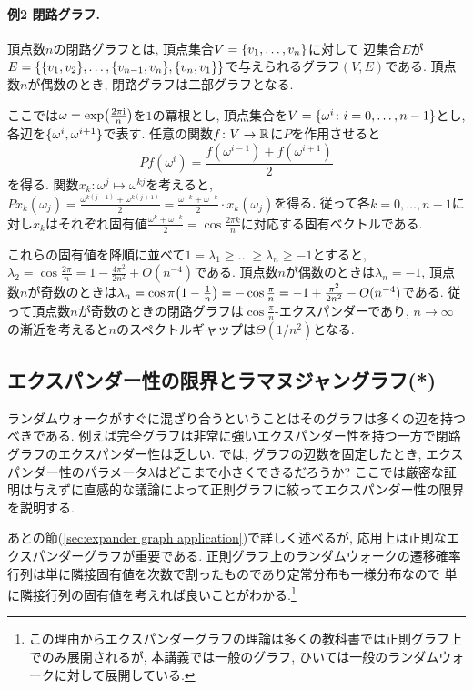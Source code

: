\paragraph*{例2 閉路グラフ.}
頂点数$n$の閉路グラフとは, 頂点集合$V=\lbrace v_1,\dots,v_n\rbrace$に対して
辺集合$E$が$E = \lbrace\lbrace v_1,v_2\rbrace,\dots,\lbrace v_{n-1},v_n\rbrace, \lbrace v_n,v_1\rbrace\rbrace$で与えられるグラフ$(V,E)$である.
頂点数$n$が偶数のとき, 閉路グラフは二部グラフとなる.

ここでは$\omega = \exp\rbra*{\frac{2\pi \mathrm{i}}{n}}$を$1$の冪根とし,
頂点集合を$V=\lbrace\omega^i \colon i=0,\dots,n-1\rbrace$とし, 各辺を$\lbrace\omega^i,\omega^{i+1}\rbrace$で表す.
任意の関数$f\colon V\to \mathbb{R}$に$P$を作用させると
\[ Pf(\omega^i) = \frac{f(\omega^{i-1}) + f(\omega^{i+1})}{2}\]
を得る.
関数$x_k\colon \omega^j \mapsto \omega^{kj}$を考えると,
$Px_k (\omega_j) = \frac{\omega^{k(j-1)} + \omega^{k(j+1)}}{2} = \frac{\omega^{-k}+\omega^{-k}}{2}\cdot x_k(\omega_j)$を得る.
従って各$k=0,\dots,n-1$に対し$x_k$はそれぞれ固有値$\frac{\omega^k + \omega^{-k}}{2} = \cos\frac{2\pi k}{n}$に対応する固有ベクトルである.

これらの固有値を降順に並べて$1=\lambda_1\ge \dots\ge \lambda_n\ge-1$とすると,
$\lambda_2 = \cos\frac{2\pi}{n} = 1-\frac{4\pi^2}{2n^2} + O(n^{-4})$である.
頂点数$n$が偶数のときは$\lambda_n = -1$,
頂点数$n$が奇数のときは$\lambda_n = \cos\pi\rbra*{1 - \frac{1}{n}} = -\cos\frac{\pi}{n} = -1 + \frac{\pi^2}{2n^2} - O(n^{-4})$である.
従って頂点数$n$が奇数のときの閉路グラフは$\cos\frac{\pi}{n}$-エクスパンダーであり,
$n\to\infty$の漸近を考えると$n$のスペクトルギャップは$\Theta(1/n^2)$となる.

\subsection{エクスパンダー性の限界とラマヌジャングラフ(*)}
ランダムウォークがすぐに混ざり合うということはそのグラフは多くの辺を持つべきである.
例えば完全グラフは非常に強いエクスパンダー性を持つ一方で閉路グラフのエクスパンダー性は乏しい.
では, グラフの辺数を固定したとき, エクスパンダー性のパラメータ$\lambda$はどこまで小さくできるだろうか?
ここでは厳密な証明は与えずに直感的な議論によって正則グラフに絞ってエクスパンダー性の限界を説明する.

あとの節(\cref{sec:expander graph application})で詳しく述べるが,
応用上は正則なエクスパンダーグラフが重要である.
正則グラフ上のランダムウォークの遷移確率行列は単に隣接固有値を次数で割ったものであり定常分布も一様分布なので
単に隣接行列の固有値を考えれば良いことがわかる.\footnote{この理由からエクスパンダーグラフの理論は多くの教科書では正則グラフ上でのみ展開されるが, 本講義では一般のグラフ, ひいては一般のランダムウォークに対して展開している.}

